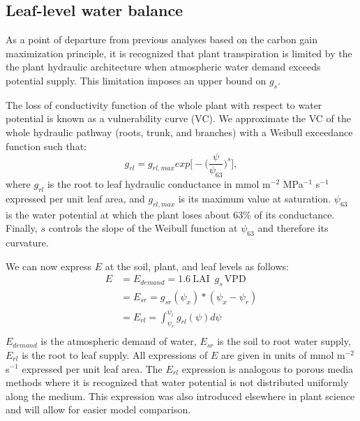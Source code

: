 \documentclass[utf8]{frontiersSCNS} %
\begin{document}
\subsection{Leaf-level water balance}

As a point of departure from previous analyses based on the carbon gain maximization principle, it is recognized that plant transpiration is limited by the the plant hydraulic architecture when atmospheric water demand exceeds potential supply. This limitation imposes an upper bound on $g_s$. 

The loss of conductivity function of the whole plant with respect to water potential is known as a vulnerability curve (VC). We approximate the VC of the whole hydraulic pathway (roots, trunk, and branches) with a Weibull exceedance function such that:
\begin{equation}
    \label{eqn:root_leaf}
    g_{rl} = g_{rl,max}exp\Big[-\Big(\frac{\psi}{\psi_{63}}\Big)^s\Big],
\end{equation}
where $g_{rl}$ is the root to leaf hydraulic conductance in mmol m$^{-2}$ MPa$^{-1}$ s$^{-1}$ expressed per unit leaf area, and $g_{rl,max}$ is its maximum value at saturation. $\psi_{63}$ is the water potential at which the plant loses about 63\% of its conductance. Finally, $s$ controls the slope of the Weibull function at $\psi_{63}$ and therefore its curvature. 

We can now express $E$ at the soil, plant, and leaf levels as follows:
\begin{equation}
    \label{eqn: mass_cons}
        \begin{split}
        E & = E_{demand} = 1.6\: \text{LAI }\, g_s\, \text{VPD} \\
        & = E_{sr} = g_{sr}(\psi_x)*(\psi_x - \psi_r)\\
        & = E_{rl} = \int_{\psi_r}^{\psi_l} g_{rl}(\psi) d\psi \\
        \end{split}
\end{equation}
$E_{demand}$ is the atmospheric demand of water, $E_{sr}$ is the soil to root water supply, $E_{rl}$ is the root to leaf supply. All expressions of $E$ are given in units of mmol m$^{-2}$ s$^{-1}$ expressed per unit leaf area. The $E_{rl}$ expression is analogous to porous media methods where it is recognized that water potential is not distributed uniformly along the medium. This expression was also introduced elsewhere in plant science \citep{Sperry2017} and will allow for easier model comparison.
\end{document}
